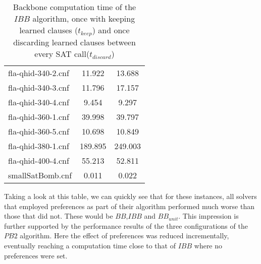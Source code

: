 \begin{wraptable}[29]{R}{7.5cm}
\begin{tabular}{l| c c }
fla-qhid-340-2.cnf & 11.922 & 13.688 \\
fla-qhid-340-3.cnf & 11.796 & 17.157 \\
fla-qhid-340-4.cnf & 9.454 & 9.297 \\
fla-qhid-360-1.cnf & 39.998 & 39.797 \\
fla-qhid-360-5.cnf & 10.698 & 10.849 \\
fla-qhid-380-1.cnf & 189.895 & 249.003 \\
fla-qhid-400-4.cnf & 55.213 & 52.811 \\
smallSatBomb.cnf & 0.011 & 0.022 \\
\end{tabular}
\caption[Benefit of keeping learned clauses in $IBB$]{Backbone computation time of the $IBB$ algorithm, once with keeping learned clauses ($t_{keep}$) and once discarding learned clauses between every SAT call($t_{discard}$)}
\label{tab:learnedIbb} %
\end{wraptable} 
Taking a look at this table, we can quickly see that for these instances, all solvers that employed preferences as part of their algorithm performed much worse than those that did not. These would be $BB$,$IBB$ and $BB_{unit}$. This impression is further supported by the performance results of the three configurations of the $PB2$ algorithm. Here the effect of preferences was reduced incrementally, eventually reaching a computation time close to that of $IBB$ where no preferences were set.



